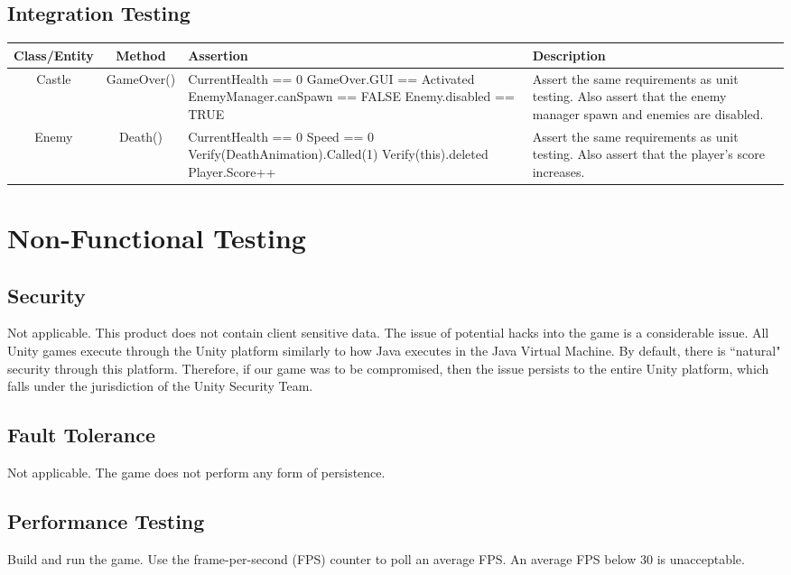 \subsection{Integration Testing}

\begin{table}[H]
	\renewcommand*{\arraystretch}{1.5}
	\centering
	\begin{tabular}{| c | c | C{6.2cm} | L{4cm} |}
		\hline
		Class/Entity	
			&	Method	
			&	Assertion	
			&	Description\\
		\hline
		Castle			
			&	GameOver()	
			&	CurrentHealth == 0 \newline
				GameOver.GUI == Activated \newline
				EnemyManager.canSpawn == FALSE \newline
				Enemy.disabled == TRUE
			&	Assert the same requirements as unit testing. Also assert that the enemy manager spawn and enemies are disabled.\\
		\hline
		Enemy
			&	Death()
			&	CurrentHealth == 0 \newline
				Speed == 0 \newline
				Verify(DeathAnimation).Called(1) \newline
				Verify(this).deleted \newline
				Player.Score++
			& Assert the same requirements as unit testing. Also assert that the player's score increases.\\
		\hline
	\end{tabular}
\end{table}

\section{Non-Functional Testing}

\subsection{Security}

Not applicable. This product does not contain client sensitive data. The issue of potential hacks into the game is a considerable issue. All Unity games execute through the Unity platform similarly to how Java executes in the Java Virtual Machine. By default, there is ``natural" security through this platform. Therefore, if our game was to be compromised, then the issue persists to the entire Unity platform, which falls under the jurisdiction of the Unity Security Team.

\subsection{Fault Tolerance}

Not applicable. The game does not perform any form of persistence.

\subsection{Performance Testing}

Build and run the game. Use the frame-per-second (FPS) counter to poll an average FPS. An average FPS below 30 is unacceptable. 

